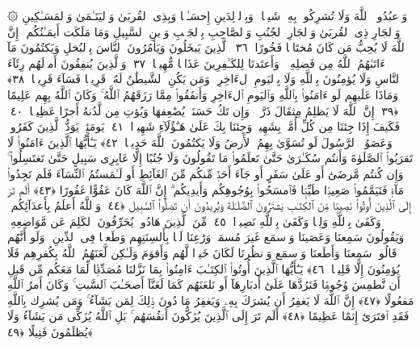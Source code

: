  ۞ وَٱعبُدُوا۟ ٱللَّهَ وَلَا تُشرِكُوا۟ بِهِۦ شَيـًۭٔا ۖ وَبِٱلوَٟلِدَينِ إِحسَـٰنًۭا وَبِذِى ٱلقُربَىٰ وَٱليَتَـٰمَىٰ وَٱلمَسَـٰكِينِ وَٱلجَارِ ذِى ٱلقُربَىٰ وَٱلجَارِ ٱلجُنُبِ وَٱلصَّاحِبِ بِٱلجَنۢبِ وَٱبنِ ٱلسَّبِيلِ وَمَا مَلَكَت أَيمَـٰنُكُم ۗ إِنَّ ٱللَّهَ لَا يُحِبُّ مَن كَانَ مُختَالًۭا فَخُورًا ﴿٣٦﴾
 ٱلَّذِينَ يَبخَلُونَ وَيَأمُرُونَ ٱلنَّاسَ بِٱلبُخلِ وَيَكتُمُونَ مَآ ءَاتَىٰهُمُ ٱللَّهُ مِن فَضلِهِۦ ۗ وَأَعتَدنَا لِلكَـٰفِرِينَ عَذَابًۭا مُّهِينًۭا ﴿٣٧﴾
 وَٱلَّذِينَ يُنفِقُونَ أَموَٟلَهُم رِئَآءَ ٱلنَّاسِ وَلَا يُؤمِنُونَ بِٱللَّهِ وَلَا بِٱليَومِ ٱلءَاخِرِ ۗ وَمَن يَكُنِ ٱلشَّيطَٰنُ لَهُۥ قَرِينًۭا فَسَآءَ قَرِينًۭا ﴿٣٨﴾
 وَمَاذَا عَلَيهِم لَو ءَامَنُوا۟ بِٱللَّهِ وَٱليَومِ ٱلءَاخِرِ وَأَنفَقُوا۟ مِمَّا رَزَقَهُمُ ٱللَّهُ ۚ وَكَانَ ٱللَّهُ بِهِم عَلِيمًا ﴿٣٩﴾
 إِنَّ ٱللَّهَ لَا يَظلِمُ مِثقَالَ ذَرَّةٍۢ ۖ وَإِن تَكُ حَسَنَةًۭ يُضَٰعِفهَا وَيُؤتِ مِن لَّدُنهُ أَجرًا عَظِيمًۭا ﴿٤٠﴾
 فَكَيفَ إِذَا جِئنَا مِن كُلِّ أُمَّةٍۭ بِشَهِيدٍۢ وَجِئنَا بِكَ عَلَىٰ هَـٰٓؤُلَآءِ شَهِيدًۭا ﴿٤١﴾
 يَومَئِذٍۢ يَوَدُّ ٱلَّذِينَ كَفَرُوا۟ وَعَصَوُا۟ ٱلرَّسُولَ لَو تُسَوَّىٰ بِهِمُ ٱلأَرضُ وَلَا يَكتُمُونَ ٱللَّهَ حَدِيثًۭا ﴿٤٢﴾
 يَـٰٓأَيُّهَا ٱلَّذِينَ ءَامَنُوا۟ لَا تَقرَبُوا۟ ٱلصَّلَوٰةَ وَأَنتُم سُكَـٰرَىٰ حَتَّىٰ تَعلَمُوا۟ مَا تَقُولُونَ وَلَا جُنُبًا إِلَّا عَابِرِى سَبِيلٍ حَتَّىٰ تَغتَسِلُوا۟ ۚ وَإِن كُنتُم مَّرضَىٰٓ أَو عَلَىٰ سَفَرٍ أَو جَآءَ أَحَدٌۭ مِّنكُم مِّنَ ٱلغَآئِطِ أَو لَـٰمَستُمُ ٱلنِّسَآءَ فَلَم تَجِدُوا۟ مَآءًۭ فَتَيَمَّمُوا۟ صَعِيدًۭا طَيِّبًۭا فَٱمسَحُوا۟ بِوُجُوهِكُم وَأَيدِيكُم ۗ إِنَّ ٱللَّهَ كَانَ عَفُوًّا غَفُورًا ﴿٤٣﴾
 أَلَم تَرَ إِلَى ٱلَّذِينَ أُوتُوا۟ نَصِيبًۭا مِّنَ ٱلكِتَـٰبِ يَشتَرُونَ ٱلضَّلَـٰلَةَ وَيُرِيدُونَ أَن تَضِلُّوا۟ ٱلسَّبِيلَ ﴿٤٤﴾
 وَٱللَّهُ أَعلَمُ بِأَعدَآئِكُم ۚ وَكَفَىٰ بِٱللَّهِ وَلِيًّۭا وَكَفَىٰ بِٱللَّهِ نَصِيرًۭا ﴿٤٥﴾
 مِّنَ ٱلَّذِينَ هَادُوا۟ يُحَرِّفُونَ ٱلكَلِمَ عَن مَّوَاضِعِهِۦ وَيَقُولُونَ سَمِعنَا وَعَصَينَا وَٱسمَع غَيرَ مُسمَعٍۢ وَرَٰعِنَا لَيًّۢا بِأَلسِنَتِهِم وَطَعنًۭا فِى ٱلدِّينِ ۚ وَلَو أَنَّهُم قَالُوا۟ سَمِعنَا وَأَطَعنَا وَٱسمَع وَٱنظُرنَا لَكَانَ خَيرًۭا لَّهُم وَأَقوَمَ وَلَـٰكِن لَّعَنَهُمُ ٱللَّهُ بِكُفرِهِم فَلَا يُؤمِنُونَ إِلَّا قَلِيلًۭا ﴿٤٦﴾
 يَـٰٓأَيُّهَا ٱلَّذِينَ أُوتُوا۟ ٱلكِتَـٰبَ ءَامِنُوا۟ بِمَا نَزَّلنَا مُصَدِّقًۭا لِّمَا مَعَكُم مِّن قَبلِ أَن نَّطمِسَ وُجُوهًۭا فَنَرُدَّهَا عَلَىٰٓ أَدبَارِهَآ أَو نَلعَنَهُم كَمَا لَعَنَّآ أَصحَـٰبَ ٱلسَّبتِ ۚ وَكَانَ أَمرُ ٱللَّهِ مَفعُولًا ﴿٤٧﴾
 إِنَّ ٱللَّهَ لَا يَغفِرُ أَن يُشرَكَ بِهِۦ وَيَغفِرُ مَا دُونَ ذَٟلِكَ لِمَن يَشَآءُ ۚ وَمَن يُشرِك بِٱللَّهِ فَقَدِ ٱفتَرَىٰٓ إِثمًا عَظِيمًا ﴿٤٨﴾
 أَلَم تَرَ إِلَى ٱلَّذِينَ يُزَكُّونَ أَنفُسَهُم ۚ بَلِ ٱللَّهُ يُزَكِّى مَن يَشَآءُ وَلَا يُظلَمُونَ فَتِيلًا ﴿٤٩﴾
